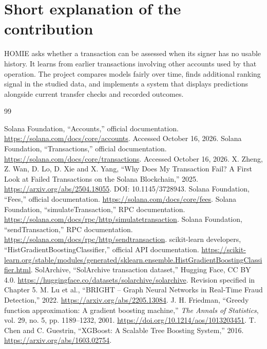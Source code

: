 \documentclass[12pt,a4paper,oneside]{report}
\begin{document}
\section{Short explanation of the contribution}
HOMIE asks whether a transaction can be assessed when its signer has no usable history. It learns from earlier transactions involving other accounts used by that operation. The project compares models fairly over time, finds additional ranking signal in the studied data, and implements a system that displays predictions alongside current transfer checks and recorded outcomes.

\renewcommand{\bibname}{REFERENCES}
\begin{thebibliography}{99}
\small\raggedright\setlength{\itemsep}{7pt}
 Solana Foundation, ``Accounts,'' official documentation. \url{https://solana.com/docs/core/accounts}. Accessed October 16, 2026.
 Solana Foundation, ``Transactions,'' official documentation. \url{https://solana.com/docs/core/transactions}. Accessed October 16, 2026.
 X. Zheng, Z. Wan, D. Lo, D. Xie and X. Yang, ``Why Does My Transaction Fail? A First Look at Failed Transactions on the Solana Blockchain,'' 2025. \url{https://arxiv.org/abs/2504.18055}. DOI: 10.1145/3728943.
 Solana Foundation, ``Fees,'' official documentation. \url{https://solana.com/docs/core/fees}.
 Solana Foundation, ``simulateTransaction,'' RPC documentation. \url{https://solana.com/docs/rpc/http/simulatetransaction}.
 Solana Foundation, ``sendTransaction,'' RPC documentation. \url{https://solana.com/docs/rpc/http/sendtransaction}.
 scikit-learn developers, ``HistGradientBoostingClassifier,'' official API documentation. \url{https://scikit-learn.org/stable/modules/generated/sklearn.ensemble.HistGradientBoostingClassifier.html}.
 SolArchive, ``SolArchive transaction dataset,'' Hugging Face, CC BY 4.0. \url{https://huggingface.co/datasets/solarchive/solarchive}. Revision specified in Chapter 5.
 M. Lu et al., ``BRIGHT -- Graph Neural Networks in Real-Time Fraud Detection,'' 2022. \url{https://arxiv.org/abs/2205.13084}.
 J. H. Friedman, ``Greedy function approximation: A gradient boosting machine,'' \emph{The Annals of Statistics}, vol. 29, no. 5, pp. 1189--1232, 2001. \url{https://doi.org/10.1214/aos/1013203451}.
 T. Chen and C. Guestrin, ``XGBoost: A Scalable Tree Boosting System,'' 2016. \url{https://arxiv.org/abs/1603.02754}.

\end{thebibliography}
\end{document}
